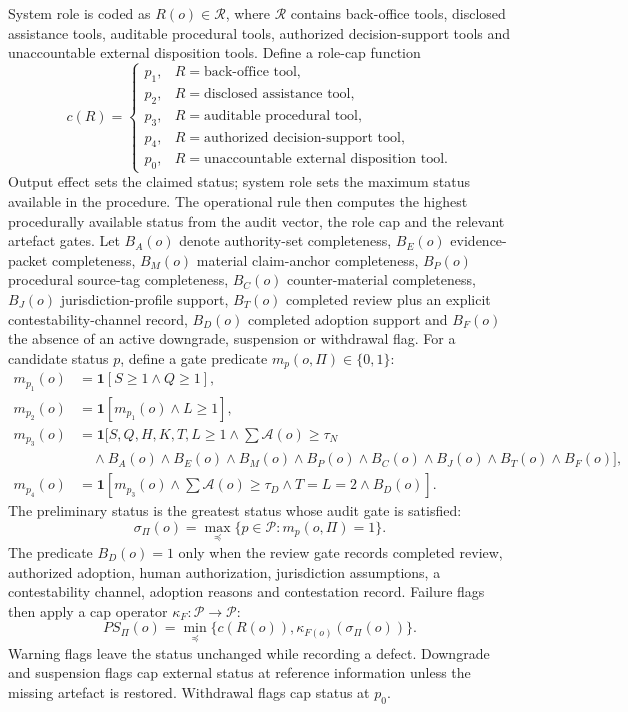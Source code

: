 \documentclass[12pt,a4paper]{article}
\begin{document}
System role is coded as $R(o)\in\mathcal{R}$, where $\mathcal{R}$ contains back-office tools, disclosed assistance tools, auditable procedural tools, authorized decision-support tools and unaccountable external disposition tools. Define a role-cap function
\[
c(R)=
\begin{cases}
p_1,&R=\text{back-office tool},\\
p_2,&R=\text{disclosed assistance tool},\\
p_3,&R=\text{auditable procedural tool},\\
p_4,&R=\text{authorized decision-support tool},\\
p_0,&R=\text{unaccountable external disposition tool}.
\end{cases}
\]
Output effect sets the claimed status; system role sets the maximum status available in the procedure. The operational rule then computes the highest procedurally available status from the audit vector, the role cap and the relevant artefact gates. Let $B_A(o)$ denote authority-set completeness, $B_E(o)$ evidence-packet completeness, $B_M(o)$ material claim-anchor completeness, $B_P(o)$ procedural source-tag completeness, $B_C(o)$ counter-material completeness, $B_J(o)$ jurisdiction-profile support, $B_T(o)$ completed review plus an explicit contestability-channel record, $B_D(o)$ completed adoption support and $B_F(o)$ the absence of an active downgrade, suspension or withdrawal flag.
For a candidate status $p$, define a gate predicate $m_p(o,\Pi)\in\{0,1\}$:
\[
\begin{aligned}
m_{p_1}(o)&=\mathbf{1}[S\geq1\land Q\geq1],\\
m_{p_2}(o)&=\mathbf{1}[m_{p_1}(o)\land L\geq1],\\
m_{p_3}(o)&=\mathbf{1}[S,Q,H,K,T,L\geq1\land \sum\mathcal{A}(o)\geq\tau_N\\
&\quad\land B_A(o)\land B_E(o)\land B_M(o)\land B_P(o)\land B_C(o)\land B_J(o)\land B_T(o)\land B_F(o)],\\
m_{p_4}(o)&=\mathbf{1}[m_{p_3}(o)\land \sum\mathcal{A}(o)\geq\tau_D\land T=L=2\land B_D(o)].
\end{aligned}
\]
The preliminary status is the greatest status whose audit gate is satisfied:
\[
\sigma_{\Pi}(o)=\max_{\preceq}\{p\in\mathcal{P}:m_p(o,\Pi)=1\}.
\]
The predicate $B_D(o)=1$ only when the review gate records completed review, authorized adoption, human authorization, jurisdiction assumptions, a contestability channel, adoption reasons and contestation record. Failure flags then apply a cap operator $\kappa_F:\mathcal{P}\rightarrow\mathcal{P}$:
\[
PS_{\Pi}(o)=\min_{\preceq}\{c(R(o)),\kappa_{F(o)}(\sigma_{\Pi}(o))\}.
\]
Warning flags leave the status unchanged while recording a defect. Downgrade and suspension flags cap external status at reference information unless the missing artefact is restored. Withdrawal flags cap status at $p_0$.
\end{document}

